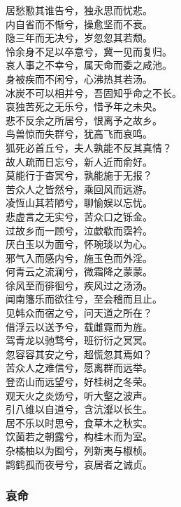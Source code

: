 \documentclass[]{article}
\begin{document}
居愁懃其谁告兮，独永思而忧悲。\\
内自省而不惭兮，操愈坚而不衰。\\
隐三年而无决兮，岁忽忽其若颓。\\
怜余身不足以卒意兮，冀一见而复归。\\
哀人事之不幸兮，属天命而委之咸池。\\
身被疾而不闲兮，心沸热其若汤。\\
冰炭不可以相并兮，吾固知乎命之不长。\\
哀独苦死之无乐兮，惜予年之未央。\\
悲不反余之所居兮，恨离予之故乡。\\
鸟兽惊而失群兮，犹高飞而哀鸣。\\
狐死必首丘兮，夫人孰能不反其真情？\\
故人疏而日忘兮，新人近而俞好。\\
莫能行于杳冥兮，孰能施于无报？\\
苦众人之皆然兮，乘回风而远游。\\
凌恆山其若陋兮，聊愉娱以忘忧。\\
悲虚言之无实兮，苦众口之铄金。\\
过故乡而一顾兮，泣歔欷而霑衿。\\
厌白玉以为面兮，怀琬琰以为心。\\
邪气入而感内兮，施玉色而外淫。\\
何青云之流澜兮，微霜降之蒙蒙。\\
徐风至而徘徊兮，疾风过之汤汤。\\
闻南籓乐而欲往兮，至会稽而且止。\\
见韩众而宿之兮，问天道之所在？\\
借浮云以送予兮，载雌霓而为旌。\\
驾青龙以驰骛兮，班衍衍之冥冥。\\
忽容容其安之兮，超慌忽其焉如？\\
苦众人之难信兮，愿离群而远举。\\
登峦山而远望兮，好桂树之冬荣。\\
观天火之炎炀兮，听大壑之波声。\\
引八维以自道兮，含沆瀣以长生。\\
居不乐以时思兮，食草木之秋实。\\
饮菌若之朝露兮，构桂木而为室。\\
杂橘柚以为囿兮，列新夷与椒桢。\\
鹍鹤孤而夜号兮，哀居者之诚贞。

\hypertarget{header-n3011}{%
\subsubsection{哀命}\label{header-n3011}}
\end{document}
